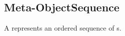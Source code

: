 \subsection{Meta-ObjectSequence}
\label{concept-Meta-ObjectSequence}

A  represents an ordered sequence of s.





